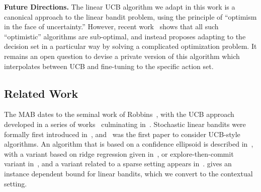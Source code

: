 \documentclass{article}
\renewcommand{\paragraph}[1]{\vspace{2pt}\noindent\textbf{#1}}
\begin{document}
\paragraph{Future Directions.} The linear UCB algorithm we adapt in
this work is a canonical approach to the linear bandit problem, using
the principle of ``optimism in the face of uncertainty.''  However,
recent work~\citep{LattimoreS17} shows that all such ``optimistic''
algorithms are sub-optimal, and instead proposes adapting to the
decision set in a particular way by solving a complicated optimization
problem.  It remains an open question to devise a private version of
this algorithm which interpolates between UCB and fine-tuning to the
specific action set.

\vspace{-1mm}

\subsection{Related Work}
\label{subsec:related_work}
The MAB dates to the seminal work of Robbins~\cite{robbins1952}, with the UCB approach developed in a series of works~\cite{BanditBook85,Agrawal95} culminating in~\cite{Auer2002}.  Stochastic linear bandits were formally first introduced in~\cite{Abe2003}, and~\cite{Auer2003UCB} was the first paper to consider UCB-style algorithms. An algorithm that is based on a confidence ellipsoid is described in~\cite{DaniStochasticLinearOptimization2008}, with a variant based on ridge regression given in~\cite{ChuLRS11}, or explore-then-commit variant in~\cite{RusmevichientongT10}, and a variant related to a sparse setting appears in~\cite{Abbasi-YadkoriPS12}. \cite{AbbasiYadkoriImprovedAlgorithmsLinear2011} gives an instance dependent bound for linear bandits, which we convert to the contextual setting.
\end{document}
